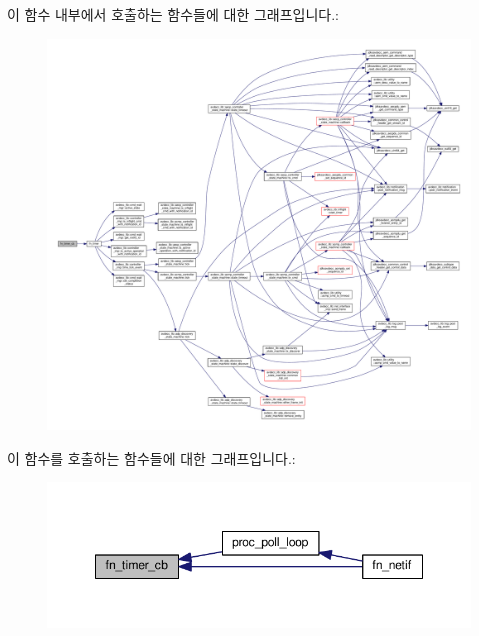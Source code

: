 이 함수 내부에서 호출하는 함수들에 대한 그래프입니다.\+:
\nopagebreak
\begin{figure}[H]
\begin{center}
\leavevmode
\includegraphics[width=350pt]{classavdecc__lib_1_1system__layer2__multithreaded__callback_ab09283b3cef1ee9a8c8664181b87f677_cgraph}
\end{center}
\end{figure}




이 함수를 호출하는 함수들에 대한 그래프입니다.\+:
\nopagebreak
\begin{figure}[H]
\begin{center}
\leavevmode
\includegraphics[width=348pt]{classavdecc__lib_1_1system__layer2__multithreaded__callback_ab09283b3cef1ee9a8c8664181b87f677_icgraph}
\end{center}
\end{figure}



